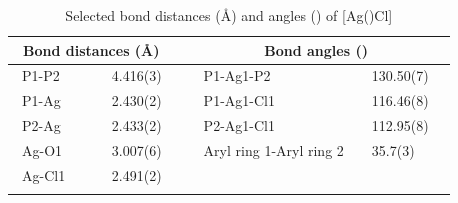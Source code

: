 \begin{table}[htbp]
\caption[Selected bond distances and angles of [Ag(\tButhixantphos)Cl{]}]{Selected bond distances (\AA) and angles (\degrees) of [Ag(\tButhixantphos)Cl]}
\vspace{1em}
\label{table:crystalthixantphossilverchloride:lengths}
\small
\begin{center}
\begin{tabular}{l l l l}
	\toprule
	\multicolumn{2}{l}{\bfseries{~Bond distances (\si{\angstrom})}} & \multicolumn{2}{c}{\bfseries{Bond angles (\degrees)}} \\
	\midrule		
	~P1-P2		~~&~~4.416(3)~~	&~~P1-Ag1-P2			&~~130.50(7)~~	\\	
	~P1-Ag		~~&~~2.430(2)~~	&~~P1-Ag1-Cl1			&~~116.46(8)~~	\\
	~P2-Ag		~~&~~2.433(2)~~	&~~P2-Ag1-Cl1			&~~112.95(8)~~	\\
	~Ag-O1		~~&~~3.007(6)~~	&~~Aryl ring 1-Aryl ring 2		&~~35.7(3)~~		\\
	~Ag-Cl1		~~&~~2.491(2)~~	&~~					&~~		~~		\\
	\bottomrule{}
\end{tabular}
\end{center}
\end{table}

